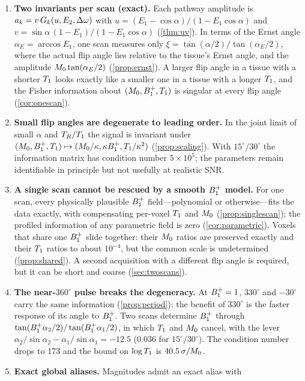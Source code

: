 \begin{enumerate}
\item \textbf{Two invariants per scan (exact).} Each pathway amplitude is
  $a_k=v\,G_k(u,E_2,\Delta\omega)$ with $u=(E_1-\cos\alpha)/(1-E_1\cos\alpha)$ and
  $v=\sin\alpha\,(1-E_1)/(1-E_1\cos\alpha)$ (\cref{thm:uv}). In terms of the Ernst angle $\alpha_E=\arccos E_1$,
  one scan measures only $\xi=\tan(\alpha/2)/\tan(\alpha_E/2)$, where the actual flip angle lies relative to
  the tissue's Ernst angle, and the amplitude $M_0\tan(\alpha_E/2)$ (\cref{prop:ernst}). A larger
  flip angle in a tissue with a shorter $T_1$ looks exactly like a smaller one in a tissue with a
  longer $T_1$, and the Fisher information about $(M_0,B_1^{+},T_1)$ is singular at every flip
  angle (\cref{cor:onescan}).
\item \textbf{Small flip angles are degenerate to leading order.} In the joint limit of small
  $\alpha$ and $T_R/T_1$ the signal is invariant under
  $(M_0,B_1^{+},T_1)\mapsto(M_0/\kappa,\kappa B_1^{+},T_1/\kappa^2)$ (\cref{prop:scaling}).
  With $15^\circ/30^\circ$ the information matrix has condition number $5\times10^5$; the
  parameters remain identifiable in principle but not usefully at realistic SNR.
\item \textbf{A single scan cannot be rescued by a smooth $B_1^{+}$ model.} For one scan, every
  physically plausible $B_1^{+}$ field---polynomial or otherwise---fits the data exactly, with
  compensating per-voxel $T_1$ and $M_0$ (\cref{prop:singlescan}); the profiled information of
  any parametric field is zero (\cref{cor:parametric}). Voxels that share one $B_1^{+}$ slide together:
  their $M_0$ ratios are preserved exactly and their $T_1$ ratios to about $10^{-4}$, but the common
  scale is undetermined (\cref{prop:shared}). A second acquisition with a different flip angle is
  required, but it can be short and coarse (\cref{sec:twoscans}).
\item \textbf{The near-$360^\circ$ pulse breaks the degeneracy.} At $B_1^{+}=1$, $330^\circ$ and
  $-30^\circ$ carry the same information (\cref{prop:period}); the benefit of $330^\circ$ is
  the faster response of its angle to $B_1^{+}$. Two scans determine $B_1^{+}$ through
  $\tan(B_1^{+}\alpha_2/2)/\tan(B_1^{+}\alpha_1/2)$, in which $T_1$ and $M_0$ cancel, with the lever
  $\alpha_2/\sin\alpha_2-\alpha_1/\sin\alpha_1=-12.5$ ($0.036$ for $15^\circ/30^\circ$). The condition number
  drops to 173 and the bound on $\log T_1$ is $40.5\,\sigma/M_0$.
\item \textbf{Exact global aliases.} Magnitudes admit an exact alias with

\end{enumerate}
